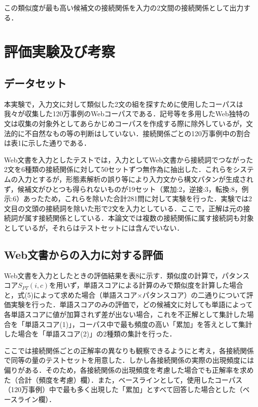 \documentclass[japanese]{jnlp_1.4}
\begin{document}
この類似度が最も高い候補文の接続関係を入力の2文間の接続関係として出力する．


\section{評価実験及び考察}

\subsection{データセット}

本実験で，入力文に対して類似した2文の組を探すために使用したコーパスは我々が収集した120万事例のWebコーパスである．記号等を多用したWeb独特の文は収集の対象外としてあらかじめコーパスを作成する際に除外しているが，文法的に不自然なもの等の判断はしていない．接続関係ごとの120万事例中の割合は表1に示した通りである．

Web文書を入力としたテストでは，入力としてWeb文書から接続詞でつながった2文を6種類の接続関係に対して50セットずつ無作為に抽出した．これらをシステムの入力とするが，形態素解析の誤り等により入力文から構文パタンが生成されず，候補文がひとつも得られないものが19セット（累加:2，逆接:3，転換:8，例示:6）あったため，これらを除いた合計281問に対して実験を行った．実験では2文目の文頭の接続詞を除いた形で2文を入力としている．ここで，正解は元の接続詞が属す接続関係としている．本論文では複数の接続関係に属す接続詞も対象としているが，それらはテストセットには含んでいない．

\subsection{Web文書からの入力に対する評価}

Web文書を入力としたときの評価結果を表8に示す．類似度の計算で，パタンスコア$S_{PT}(i,c)$を用いず，単語スコアによる計算のみで類似度を計算した場合と，式(5)によって求めた場合（単語スコア×パタンスコア）の二通りについて評価実験を行った．単語スコアのみの評価で，どの候補文に対しても単語によって各単語スコアに値が加算されず差が出ない場合，これを不正解として集計した場合を「単語スコア(1)」，コーパス中で最も頻度の高い「累加」を答えとして集計した場合を「単語スコア(2)」の2種類の集計を行った．

ここでは接続関係ごとの正解率の異なりも観察できるようにと考え，各接続関係で同等の量のテストセットを用意した．しかし各接続関係の実際の出現頻度には偏りがある．そのため，各接続関係の出現頻度を考慮した場合でも正解率を求めた（合計（頻度を考慮）欄）．また，ベースラインとして，使用したコーパス（120万事例）中で最も多く出現した「累加」とすべて回答した場合とした（ベースライン欄）．
\end{document}
